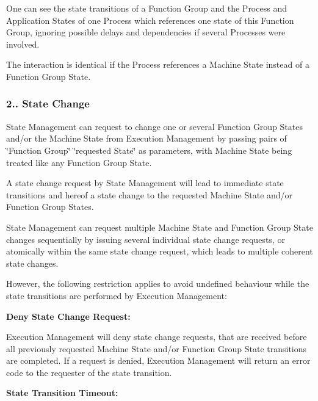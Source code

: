\begin{DoxyItemize}
\item One can see the state transitions of a Function Group and the Process and Application States of one Process which references one state of this Function Group, ignoring possible delays and dependencies if several Processes were involved.
\item The interaction is identical if the Process references a Machine State instead of a Function Group State.
\end{DoxyItemize}

\subsubsection*{2.. {\bfseries State Change}}


\begin{DoxyItemize}
\item State Management can request to change one or several Function Group States and/or the Machine State from Execution Management by passing pairs of \char`\"{}\+Function Group\char`\"{} \char`\"{}requested State\char`\"{} as parameters, with Machine State being treated like any Function Group State.
\item A state change request by State Management will lead to immediate state transitions and hereof a state change to the requested Machine State and/or Function Group States.
\item State Management can request multiple Machine State and Function Group State changes sequentially by issuing several individual state change requests, or atomically within the same state change request, which leads to multiple coherent state changes.
\item However, the following restriction applies to avoid undefined behaviour while the state transitions are performed by Execution Management\+:
\item {\bfseries Deny State Change Request\+:}
\begin{DoxyItemize}
\item Execution Management will deny state change requests, that are received before all previously requested Machine State and/or Function Group State transitions are completed. If a request is denied, Execution Management will return an error code to the requester of the state transition.
\end{DoxyItemize}
\item {\bfseries State Transition Timeout\+:}
\begin{DoxyItemize}

\end{DoxyItemize}
\end{DoxyItemize}
